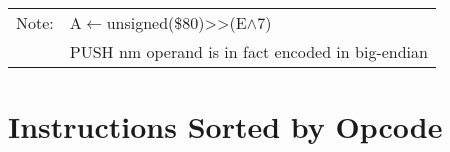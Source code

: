 \documentclass[oneside,a4paper]{book}
\newcommand{\notet}{\rule{0pt}{2.4ex}}
\begin{document}
{\begin{tabular}{llcccccccccccccccl}
		\hline

		Note:

			& \multicolumn{17}{l}{\parbox{12cm}{\footnotemark[1] A$\leftarrow$unsigned(\$80)>>(E$\wedge$7)}}\notet \\

			& \multicolumn{17}{l}{\parbox{12cm}{\footnotemark[2] PUSH nm operand is in fact encoded in big-endian}}\notet \\

		\hline

	\end{tabular}
}

\stopcontents[intrstructionsections]



\chapter{Instructions Sorted by Opcode}
\end{document}
